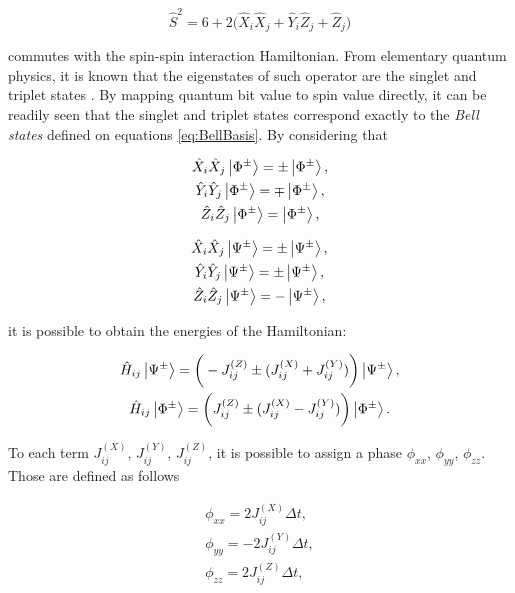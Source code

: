       \begin{equation}
        \hat{S}^2 = 6 + 2\Big(\hat{X}_i\hat{X}_j + \hat{Y}_i\hat{Z}_j + \hat{Z}_j\Big) 
        \label{eq:TotalSpin}
      \end{equation}

      \noindent commutes with the spin-spin interaction Hamiltonian. From elementary quantum physics, it is known that the eigenstates of such operator are the singlet and triplet states \cite{Beck}. By mapping quantum bit value to spin value directly, it can be readily seen that the singlet and triplet states correspond exactly to the \textit{Bell states} defined on equations \ref{eq:BellBasis}. By considering that

      \begin{gather}
        \hat{X}_i\hat{X}_j \ket{\Phi^{\pm}} = \pm\ket{\Phi^{\pm}}, \\
        \hat{Y}_i\hat{Y}_j \ket{\Phi^{\pm}} = \mp\ket{\Phi^{\pm}}, \\
        \hat{Z}_i\hat{Z}_j \ket{\Phi^{\pm}} = \ket{\Phi^{\pm}},
        \label{eq:PhiBellBasisOps}
      \end{gather}

      \begin{gather}
        \hat{X}_i\hat{X}_j \ket{\Psi^{\pm}} = \pm\ket{\Psi^{\pm}}, \\
        \hat{Y}_i\hat{Y}_j \ket{\Psi^{\pm}} = \pm\ket{\Psi^{\pm}}, \\
        \hat{Z}_i\hat{Z}_j \ket{\Psi^{\pm}} = -\ket{\Psi^{\pm}},
        \label{eq:PsiBellBasisOps}
      \end{gather}

      \noindent it is possible to obtain the energies of the Hamiltonian:

      \begin{gather}
        \hat{H}_{ij} \ket{\Psi^{\pm}} = \bigg(-J_{ij}^{(Z)} \pm (J_{ij}^{(X)} + J_{ij}^{(Y)})\bigg) \ket{\Psi^{\pm}}, \\
        \hat{H}_{ij} \ket{\Phi^{\pm}} = \bigg(J_{ij}^{(Z)} \pm (J_{ij}^{(X)} - J_{ij}^{(Y)})\bigg) \ket{\Phi^{\pm}}.
        \label{eq:SpinSpinEnergies}
      \end{gather}

      To each term $J_{ij}^{(X)}$, $J_{ij}^{(Y)}$, $J_{ij}^{(Z)}$, it is possible to assign a phase $\phi_{xx}$, $\phi_{yy}$, $\phi_{zz}$. Those are defined as follows

      \begin{gather}
        \phi_{xx} = 2 J_{ij}^{(X)} \Delta t, \\
        \phi_{yy} = -2 J_{ij}^{(Y)} \Delta t, \\
        \phi_{zz} = 2 J_{ij}^{(Z)} \Delta t,
        \label{eq:SpinSpinPhases}
      \end{gather}
      
